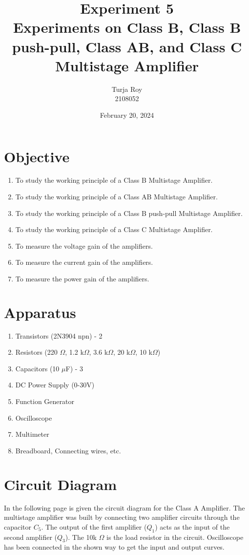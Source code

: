 \documentclass[12pt]{article}
\title{
    \textbf{Experiment 5}\\
    \textbf{\large Experiments on Class B, Class B push-pull, Class AB, and Class C Multistage Amplifier}
}
\author{
    Turja Roy\\
    2108052
}
\date{February 20, 2024}
\begin{document}
\maketitle

\section{Objective}
\begin{enumerate}
    \item To study the working principle of a Class B Multistage Amplifier.
    \item To study the working principle of a Class AB Multistage Amplifier.
    \item To study the working principle of a Class B push-pull Multistage Amplifier.
    \item To study the working principle of a Class C Multistage Amplifier.
    \item To measure the voltage gain of the amplifiers.
    \item To measure the current gain of the amplifiers.
    \item To measure the power gain of the amplifiers.
\end{enumerate}

\section{Apparatus}
\begin{enumerate}
    \item Transistors (2N3904 npn) - 2
    \item Resistors (220 $\Omega$, 1.2 k$\Omega$, 3.6 k$\Omega$, 20 k$\Omega$, 10 k$\Omega$)
    \item Capacitors (10 $\mu$F) - 3
    \item DC Power Supply (0-30V)
    \item Function Generator
    \item Oscilloscope
    \item Multimeter
    \item Breadboard, Connecting wires, etc.
\end{enumerate}

\section{Circuit Diagram}
In the following page is given the circuit diagram for the Class A Amplifier. The multistage amplifier was built by connecting two amplifier circuits through the capacitor $C_5$. The output of the first amplifier ($Q_1$) acts as the input of the second amplifier ($Q_3$). The 10k $\Omega$ is the load resistor in the circuit. Oscilloscope has been connected in the shown way to get the input and output curves.
\end{document}
